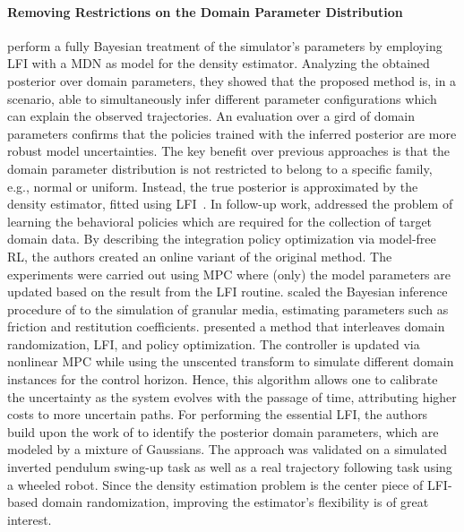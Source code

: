 \documentclass[utf8]{frontiersSCNS} %
\begin{document}
\paragraph*{Removing Restrictions on the Domain Parameter Distribution}
%
\citet{Ramos_Fox_19} perform a fully Bayesian treatment of the simulator's parameters by employing \acf{LFI} with a \ac{MDN} as model for the density estimator.
Analyzing the obtained posterior over domain parameters, they showed that the proposed method is, in a \simtosim scenario, able to simultaneously infer different parameter configurations which can explain the observed trajectories.
An evaluation over a gird of domain parameters confirms that the policies trained with the inferred posterior are more robust model uncertainties.
The key benefit over previous approaches is that the domain parameter distribution is not restricted to belong to a specific family, e.g., normal or uniform.
Instead, the true posterior is approximated by the density estimator, fitted using \ac{LFI}~\citep{Papamakarios_Murray_16}.
%
In follow-up work, \citet{Possas_Ramos_20} addressed the problem of learning the behavioral policies which are required for the collection of target domain data.
By describing the integration policy optimization via model-free \ac{RL}, the authors created an online variant of the original method.
The \simtoreal experiments were carried out using \ac{MPC} where (only) the model parameters are updated based on the result from the \ac{LFI} routine.
%
\citet{Matl_Fox_20} scaled the Bayesian inference procedure of \citet{Ramos_Fox_19} to the simulation of granular media, estimating parameters such as friction and restitution coefficients.
% 
\citet{Barcelos_Ramos_20} presented a method that interleaves domain randomization, \ac{LFI}, and policy optimization.
The controller is updated via nonlinear \ac{MPC} while using the unscented transform to simulate different domain instances for the control horizon.
Hence, this algorithm allows one to calibrate the uncertainty as the system evolves with the passage of time, attributing higher costs to more uncertain paths.
For performing the essential \ac{LFI}, the authors build upon the work of \citet{Ramos_Fox_19} to identify the posterior domain parameters, which are modeled by a mixture of Gaussians. %
The approach was validated on a simulated inverted pendulum swing-up task as well as a real trajectory following task using a wheeled robot.
%
Since the density estimation problem is the center piece of \ac{LFI}-based domain randomization, improving the estimator's flexibility is of great interest.
\end{document}
